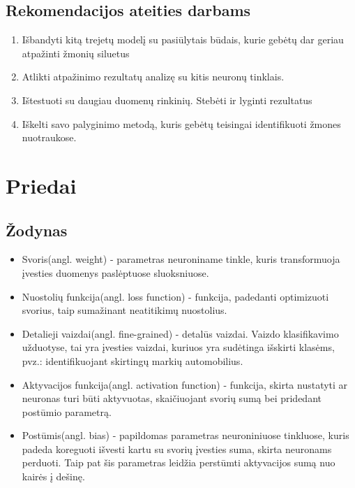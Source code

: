 \documentclass{VUMIFPSkursinis}
\begin{document}
\subsection{Rekomendacijos ateities darbams}
\begin{enumerate}
\item{Išbandyti kitą trejetų modelį su pasiūlytais būdais, kurie gebėtų dar geriau atpažinti žmonių siluetus}
\item{Atlikti atpažinimo rezultatų analizę su kitis neuronų tinklais.}
\item{Ištestuoti su daugiau duomenų rinkinių. Stebėti ir lyginti rezultatus}
\item{Iškelti savo palyginimo metodą, kuris gebėtų teisingai identifikuoti žmones nuotraukose.}
\end{enumerate}
\pagebreak

\section{Priedai}
\thispagestyle{empty} 
\subsection{Žodynas}
\begin{itemize}
\item{Svoris(angl. weight) - parametras neuroniname tinkle, kuris transformuoja įvesties duomenys paslėptuose sluoksniuose.}
\item{Nuostolių funkcija(angl. loss function) - funkcija, padedanti optimizuoti svorius, taip sumažinant neatitikimų nuostolius.}
\item{Detalieji vaizdai(angl. fine-grained) - detalūs vaizdai. Vaizdo klasifikavimo užduotyse, tai yra įvesties vaizdai, kuriuos yra sudėtinga išskirti klasėms, pvz.: identifikuojant skirtingų markių automobilius.}
\item{Aktyvacijos funkcija(angl. activation function) - funkcija, skirta nustatyti ar neuronas turi būti aktyvuotas, skaičiuojant svorių sumą bei pridedant postūmio parametrą.}
\item{Postūmis(angl. bias) - papildomas parametras neuroniniuose tinkluose, kuris padeda koreguoti išvesti kartu su svorių įvesties suma, skirta neuronams perduoti. Taip pat šis parametras leidžia perstūmti aktyvacijos sumą nuo kairės į dešinę.}
\end{itemize} 
\pagebreak

\printbibliography[heading=bibintoc] 
\thispagestyle{empty}
\end{document}
